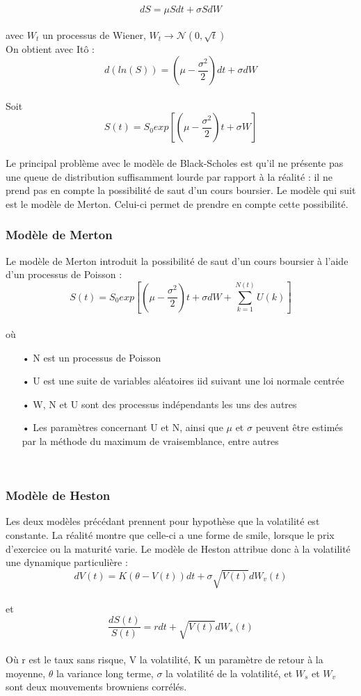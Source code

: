 \documentclass[french,12pt,a4paper]{article}
\begin{document}
$$ dS = \mu Sdt + \sigma SdW $$  \\
avec $W_{t}$ un processus de Wiener, $ W_{t} \rightarrow \mathcal{N}(0,\sqrt{t}) $ \\

On obtient avec Itô : \\
$$ d(ln(S))=(\mu - \frac{\sigma^{2}}{2})dt + \sigma dW $$ \\
Soit \\
$$ S(t) = S_{0} exp \left[(\mu - \frac{\sigma^{2}}{2})t + \sigma W \right] $$ \\

Le principal problème avec le modèle de Black-Scholes est qu'il ne présente pas une queue de distribution suffisamment lourde par rapport à la réalité : il ne prend pas en compte la possibilité de saut d'un cours boursier. Le modèle qui suit est le modèle de Merton. Celui-ci permet de prendre en compte cette possibilité.\\

\subsubsection{Modèle de Merton}
Le modèle de Merton introduit la possibilité de saut d'un cours boursier à l'aide d'un processus de Poisson :\\

$$ S(t) = S_{0} exp \left[(\mu - \frac{\sigma^{2}}{2})t + \sigma dW + \sum_{k=1}^{N(t)} U(k) \right] $$ \\
où
\begin{itemize}
\item[•] N est un processus de Poisson
\item[•] U est une suite de variables aléatoires iid suivant une loi normale centrée
\item[•] W, N et U sont des processus indépendants les uns des autres
\item[•] Les paramètres concernant U et N, ainsi que $\mu$ et $\sigma$ peuvent être estimés par la méthode du maximum de vraisemblance, entre autres
\end{itemize}
\\

\subsubsection{Modèle de Heston}
Les deux modèles précédant prennent pour hypothèse que la volatilité est constante. La réalité montre que celle-ci a une forme de smile, lorsque le prix d'exercice ou la maturité varie. Le modèle de Heston attribue donc à la volatilité une dynamique particulière : \\
$$ dV(t) = K(\theta - V(t))dt + \sigma \sqrt{V(t)} dW_{v}(t)  $$ \\
et \\
$$ \frac{dS(t)}{S(t)} = rdt + \sqrt{V(t)}dW_{s}(t) $$ \\
Où r est le taux sans risque, V la volatilité, K un paramètre de retour à la moyenne, $\theta$ la variance long terme, $\sigma$ la volatilité de la volatilité, et  $W_{s}$ et $W_{v}$ sont deux mouvements browniens corrélés.\\
\end{document}
